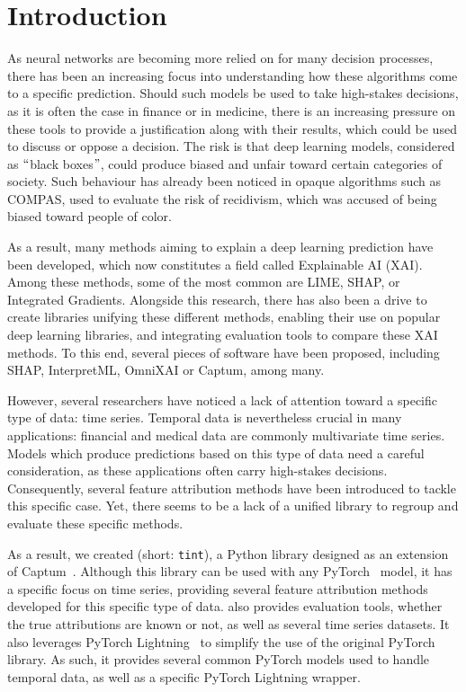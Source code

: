 \section{Introduction}
\label{sec:introduction}

As neural networks are becoming more relied on for many decision processes, there has been an increasing focus into
understanding how these algorithms come to a specific prediction.
Should such models be used to take high-stakes decisions, as it is often the case in finance or in medicine, there is an
increasing pressure on these tools to provide a justification along with their results, which could be used to discuss
or oppose a decision.
The risk is that deep learning models, considered as $``$black boxes$"$, could produce biased and unfair toward certain
categories of society.
Such behaviour has already been noticed in opaque algorithms such as COMPAS, used to evaluate the risk of recidivism,
which was accused of being biased toward people of color.

As a result, many methods aiming to explain a deep learning prediction have been developed, which now constitutes a
field called Explainable AI (XAI).
Among these methods, some of the most common are LIME, SHAP, or Integrated Gradients.
Alongside this research, there has also been a drive to create libraries unifying these different methods, enabling
their use on popular deep learning libraries, and integrating evaluation tools to compare these XAI methods.
To this end, several pieces of software have been proposed, including SHAP, InterpretML, OmniXAI or Captum, among many.

However, several researchers have noticed a lack of attention toward a specific type of data: time series.
Temporal data is nevertheless crucial in many applications: financial and medical data are commonly multivariate time
series.
Models which produce predictions based on this type of data need a careful consideration, as these applications often
carry high-stakes decisions.
Consequently, several feature attribution methods have been introduced to tackle this specific case.
Yet, there seems to be a lack of a unified library to regroup and evaluate these specific methods.

As a result, we created \texttt{} (short: \texttt{tint}), a Python library designed as an
extension of Captum~\citep{kokhlikyan2020captum}.
Although this library can be used with any PyTorch~\citep{NEURIPS2019_9015} model, it has a specific focus on time series,
providing several feature attribution methods developed for this specific type of data.
\texttt{} also provides evaluation tools, whether the true attributions are known or not, as
well as several time series datasets.
It also leverages PyTorch Lightning~\citep{Falcon_PyTorch_Lightning_2019} to simplify the use of the original PyTorch
library.
As such, it provides several common PyTorch models used to handle temporal data, as well as a specific PyTorch Lightning
wrapper.

